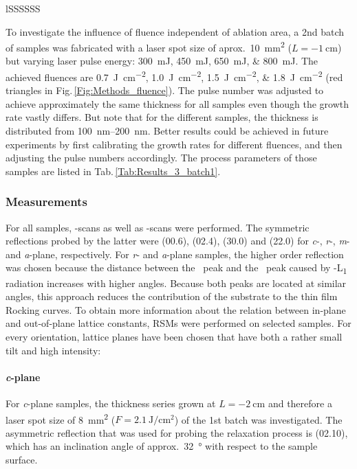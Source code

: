 \begin{table}
\begin{tabular}{lSSSSSS}
    \end{tabular}
    \label{Tab:Results_3_batch1}
\end{table}

To investigate the influence of fluence independent of ablation area, a 2nd batch of samples was fabricated with a laser spot size of aprox.\ \qty{10}{\mm\squared} ($L=\qty{-1}{\cm}$) but varying laser pulse energy:
\qtylist{300;450;650;800}{\milli\joule}.
The achieved fluences are \qtylist{0.7;1.0;1.5;1.8}{\J\per\cm\squared} (red triangles in Fig.\,\ref{Fig:Methods_fluence}).
The pulse number was adjusted to achieve approximately the same thickness for all samples even though the growth rate vastly differs.
But note that for the different samples, the thickness is distributed from \qtyrange{100}{200}{\nm}.
Better results could be achieved in future experiments by first calibrating the growth rates for different fluences, and then adjusting the pulse numbers accordingly.
The process parameters of those samples are listed in Tab.\,\ref{Tab:Results_3_batch1}.

\subsubsection*{Measurements}
For all samples, \thetaomega-scans as well as \textomega-scans were performed.
The symmetric reflections probed by the latter were (00.6), (02.4), (30.0) and (22.0) for \textit{c}-, \textit{r}-, \textit{m}- and \textit{a}-plane, respectively.
For \textit{r}- and \textit{a}-plane samples, the higher order reflection was chosen because the distance between the \cro\ peak and the \alo\ peak caused by -L\textalpha\textsubscript{1} radiation increases with higher angles.
Because both peaks are located at similar angles, this approach reduces the contribution of the substrate to the thin film Rocking curves.
To obtain more information about the relation between in-plane and out-of-plane lattice constants, \glspl{RSM} were performed on selected samples.
For every orientation, lattice planes have been chosen that have both a rather small tilt and high intensity:

\paragraph{\textit{c}-plane}
    For \textit{c}-plane samples, the thickness series grown at $L=\qty{-2}{\cm}$ and therefore a laser spot size of \qty{8}{\mm\squared} ($F=\qty{2.1}{\J\per\cm\squared}$) of the 1st batch was investigated.
    The asymmetric reflection that was used for probing the relaxation process is (02.10), which has an inclination angle of approx.\ \qty{32}{\degree} with respect to the sample surface.
